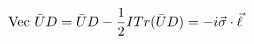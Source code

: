 \begin{equation}
{\rm Vec}~\bar{U}D = \bar{U}D-\frac{1}{2} I Tr(\bar{U}D)= -i \vec{\sigma} \cdot \vec{\ell}
\end{equation}

